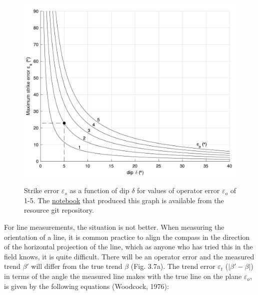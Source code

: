 \documentclass[a4paper , 12pt]{book}
\begin{document}
\begin{figure}[ht]
    \centering
    {\includegraphics[width=12cm]{ch3f6.pdf}}
    \caption{Strike error $\varepsilon_s$ as a function of dip $\delta$ for values of operator error $\varepsilon_o$  of 1-5\degree. The \href{https://github.com/nfcd/compGeo/blob/master/source/notebooks/ch3-fig6.ipynb}{notebook} that produced this graph is available from the resource git repository.}
\end{figure}

For line measurements, the situation is not better. When measuring the orientation of a line, it is common practice to align the compass in the direction of the horizontal projection of the line, which as anyone who has tried this in the field knows, it is quite difficult. There will be an operator error and the measured trend $\beta\text{$'$}$ will differ from the true trend $\beta$ (Fig. 3.7a). The trend error $\varepsilon_t$ ($|\beta\text{$'$}- \beta|$) in terms of the angle the measured line makes with the true line on the plane $\varepsilon_o$, is given by the following equations (Woodcock, 1976): 
\end{document}
